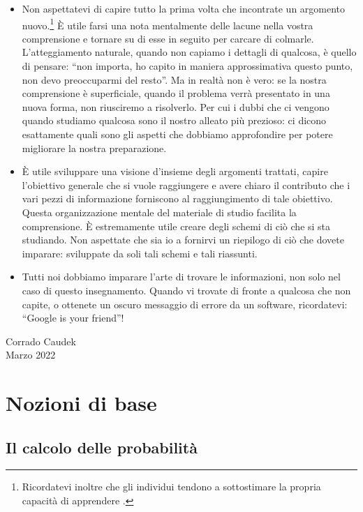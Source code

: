 \documentclass[
  11pt,
]{krantz}
\theoremstyle{definition}
\theoremstyle{definition}
\theoremstyle{definition}
\theoremstyle{definition}
\theoremstyle{remark}
\begin{document}
\begin{itemize}
\item
  Non aspettatevi di capire tutto la prima volta che incontrate un argomento nuovo.\footnote{Ricordatevi inoltre che gli individui tendono a sottostimare la propria capacità di apprendere \citep{horn2021underestimating}.} È utile farsi una nota mentalmente delle lacune nella vostra comprensione e tornare su di esse in seguito per carcare di colmarle. L'atteggiamento naturale, quando non capiamo i dettagli di qualcosa, è quello di pensare: ``non importa, ho capito in maniera approssimativa questo punto, non devo preoccuparmi del resto''. Ma in realtà non è vero: se la nostra comprensione è superficiale, quando il problema verrà presentato in una nuova forma, non riusciremo a risolverlo. Per cui i dubbi che ci vengono quando studiamo qualcosa sono il nostro alleato più prezioso: ci dicono esattamente quali sono gli aspetti che dobbiamo approfondire per potere migliorare la nostra preparazione.
\item
  È utile sviluppare una visione d'insieme degli argomenti trattati, capire l'obiettivo generale che si vuole raggiungere e avere chiaro il contributo che i vari pezzi di informazione forniscono al raggiungimento di tale obiettivo. Questa organizzazione mentale del materiale di studio facilita la comprensione. È estremamente utile creare degli schemi di ciò che si sta studiando. Non aspettate che sia io a fornirvi un riepilogo di ciò che dovete imparare: sviluppate da soli tali schemi e tali riassunti.
\item
  Tutti noi dobbiamo imparare l'arte di trovare le informazioni, non solo nel caso di questo insegnamento. Quando vi trovate di fronte a qualcosa che non capite, o ottenete un oscuro messaggio di errore da un software, ricordatevi: ``Google is your friend''!
\end{itemize}

\begin{flushright}
Corrado Caudek\\
Marzo 2022 \end{flushright}

\mainmatter

\hypertarget{part-nozioni-di-base}{%
\part*{Nozioni di base}\label{part-nozioni-di-base}}


\hypertarget{intro-prob-1}{%
\chapter{Il calcolo delle probabilità}\label{intro-prob-1}}
\end{document}
